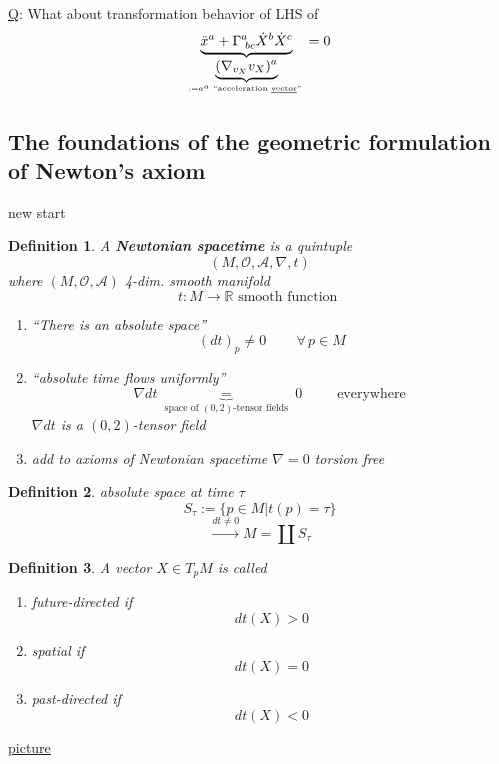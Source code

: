 \documentclass[10pt]{amsart}
\newtheorem{definition}{Definition}
\begin{document}
\begin{multicols*}{2}
	\underline{Q}: What about transformation behavior of LHS of 
	\[
	\underbrace{ \ddot{x}^a + \Gamma^a_{ \, \, bc } \dot{X}^b \dot{X}^c}_{ \underbrace{ (\nabla_{v_X}v_X)^a}_{ := a^a \text{ ``acceleration \underline{vector}'' } } } = 0
	\]
	
	\subsection{The foundations of the geometric formulation of Newton's axiom}
	
	new start
	\begin{definition}
		A \textbf{Newtonian spacetime} is a quintuple \[
		(M , \mathcal{O}, \mathcal{A}, \nabla , t)
		\]
		where $(M,\mathcal{O}, \mathcal{A})$ 4-dim. smooth manifold
		\[
		t: M \to \mathbb{R} \text{ smooth function }
		\]
		
		\begin{enumerate}
			\item[(i)] ``There is an absolute space''
			\[
			(dt)_p \neq 0 \quad \quad \, \forall \, p \in M 
			\]
			\item[(ii)] ``absolute time flows uniformly''
			\[
			\nabla dt \underbrace{=}_{ \text{ space of $(0,2)$-tensor fields } }  0 \quad \quad \, \text{ everywhere }
			\]
			$\nabla dt $ is a $(0,2)$-tensor field
			\item[(iii)] add to axioms of Newtonian spacetime 
			$\nabla = 0$ torsion free
		\end{enumerate}
	\end{definition}
	
	\begin{definition}
		absolute space at time $\tau$ 
		\[
		S_{\tau} := \lbrace p\in M | t(p) = \tau \rbrace
		\]
		\[
		\xrightarrow{ dt \neq 0 } M = \coprod S_{\tau}
		\]
	\end{definition}
	
	\begin{definition} A vector $X \in T_p M$ is called 
		\begin{enumerate}
			\item[(a)] future-directed if 
			\[
			dt(X) > 0 
			\]
			\item[(b)] spatial if 
			\[
			dt(X) = 0 
			\]
			\item[(c)]
			past-directed if 
			\[
			dt(X) < 0
			\]
		\end{enumerate}
	\end{definition}
	
	\underline{picture}
	

\end{multicols*}
\end{document}
